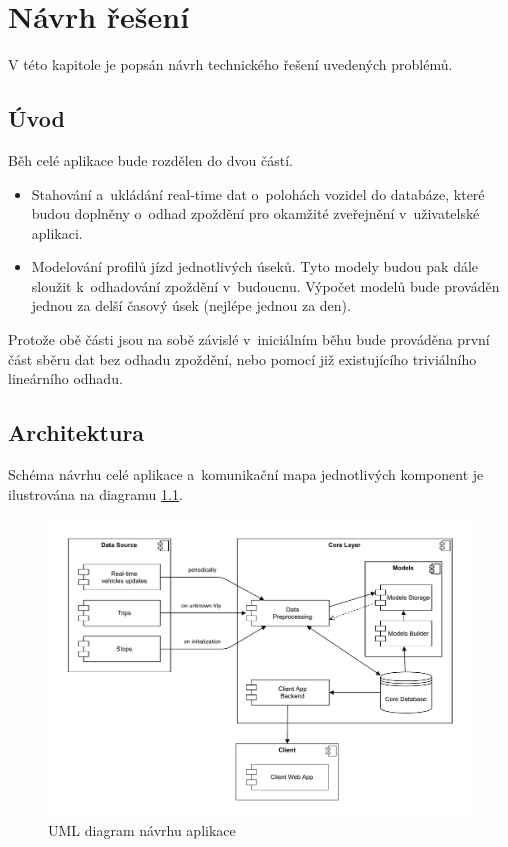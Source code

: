 

\chapter{Návrh řešení}


V této kapitole je popsán návrh technického řešení uvedených problémů.


\section{Úvod}


Běh celé aplikace bude rozdělen do dvou částí.


\begin{itemize}
\item Stahování a~ukládání real-time dat o~polohách vozidel do databáze, které budou doplněny o~odhad zpoždění pro okamžité zveřejnění v~uživatelské aplikaci.


\item Modelování profilů jízd jednotlivých úseků. Tyto modely budou pak dále sloužit k~odhadování zpoždění v~budoucnu. Výpočet modelů bude prováděn jednou za delší časový úsek (nejlépe jednou za den).
\end{itemize}


Protože obě části jsou na sobě závislé v~iniciálním běhu bude prováděna první část sběru dat bez odhadu zpoždění, nebo pomocí již existujícího triviálního lineárního odhadu.

\section{Architektura}


Schéma návrhu celé aplikace a~komunikační mapa jednotlivých komponent je ilustrována na diagramu \ref{fig:design_diagram}.


\begin{figure}
\centering
  \includegraphics[width=\linewidth]{../img/design_diagram}
  \caption{UML diagram návrhu aplikace}
  \label{fig:design_diagram}
\end{figure}


